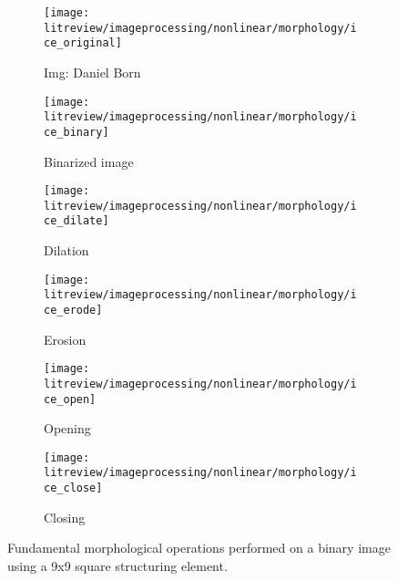 \renewcommand{\arraystretch}{0.6} %
\begin{figure}[H]
    \centering
    \begin{subfigure}[b]{0.49\textwidth}
        \texttt{[image: litreview/imageprocessing/nonlinear/morphology/ice\_original]}
        \caption{Img: Daniel Born}
        \label{fig:ice}
    \end{subfigure}
    \begin{subfigure}[b]{0.49\textwidth}
        \texttt{[image: litreview/imageprocessing/nonlinear/morphology/ice\_binary]}
        \caption{Binarized image}
        \label{fig:ice_binary}
    \end{subfigure}
    \begin{subfigure}[b]{0.49\textwidth}
        \texttt{[image: litreview/imageprocessing/nonlinear/morphology/ice\_dilate]}
        \caption{Dilation}
        \label{fig:ice_dilation}
    \end{subfigure}
    \begin{subfigure}[b]{0.49\textwidth}
        \texttt{[image: litreview/imageprocessing/nonlinear/morphology/ice\_erode]}
        \caption{Erosion}
        \label{fig:ice_erosion}
    \end{subfigure}
    \begin{subfigure}[b]{0.49\textwidth}
        \texttt{[image: litreview/imageprocessing/nonlinear/morphology/ice\_open]}
        \caption{Opening}
        \label{fig:ice_open}
    \end{subfigure} 
    \begin{subfigure}[b]{0.49\textwidth}
        \texttt{[image: litreview/imageprocessing/nonlinear/morphology/ice\_close]}
        \caption{Closing}
        \label{fig:ice_close}
    \end{subfigure} 
    \captionsetup{format = hang}
    \caption{Fundamental morphological  operations performed on a binary image using a 9x9 square structuring element.}
    \label{fig:morphology}
  \end{figure}


